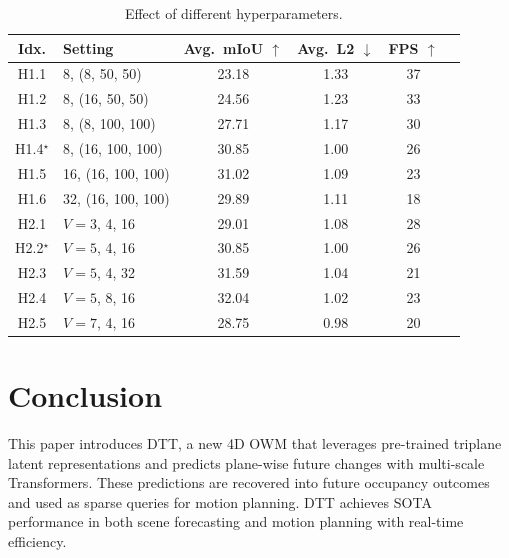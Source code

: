 \documentclass[11pt,a4paper]{article}
\begin{document}
\begin{table}[htbp]
  \centering
  \caption{Effect of different hyperparameters.}
  \label{tab:hyperparams}
  \begin{tabular}{clcccc}
    \toprule
    Idx. & Setting & Avg.\ mIoU $\uparrow$ & Avg.\ L2 $\downarrow$ & FPS $\uparrow$ \\
    \midrule
    H1.1 & 8, (8, 50, 50)       & 23.18 & 1.33 & 37 \\
    H1.2 & 8, (16, 50, 50)      & 24.56 & 1.23 & 33 \\
    H1.3 & 8, (8, 100, 100)     & 27.71 & 1.17 & 30 \\
    H1.4$^\star$ & 8, (16, 100, 100) & 30.85 & 1.00 & 26 \\
    H1.5 & 16, (16, 100, 100)   & 31.02 & 1.09 & 23 \\
    H1.6 & 32, (16, 100, 100)   & 29.89 & 1.11 & 18 \\
    \midrule
    H2.1 & $V = 3$, 4, 16       & 29.01 & 1.08 & 28 \\
    H2.2$^\star$ & $V = 5$, 4, 16 & 30.85 & 1.00 & 26 \\
    H2.3 & $V = 5$, 4, 32       & 31.59 & 1.04 & 21 \\
    H2.4 & $V = 5$, 8, 16       & 32.04 & 1.02 & 23 \\
    H2.5 & $V = 7$, 4, 16       & 28.75 & 0.98 & 20 \\
    \bottomrule
  \end{tabular}
\end{table}

\section{Conclusion}

This paper introduces DTT, a new 4D OWM that leverages pre-trained triplane latent representations and predicts plane-wise future changes with multi-scale Transformers.
These predictions are recovered into future occupancy outcomes and used as sparse queries for motion planning.
DTT achieves SOTA performance in both scene forecasting and motion planning with real-time efficiency.



\end{document}
